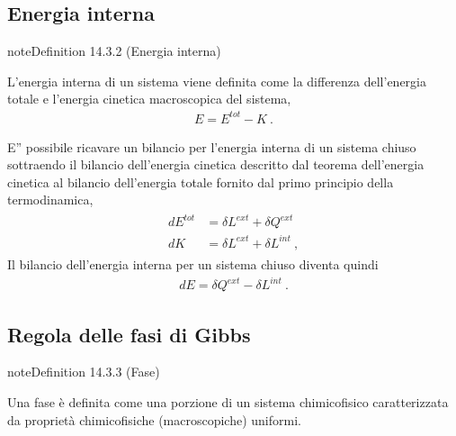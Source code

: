 \documentclass[letterpaper,10pt,italian]{jupyterBook}
\begin{document}
\subsection{Energia interna}
\label{\detokenize{ch/thermodynamics/principles-gibbs-phase-rule:energia-interna}}\label{\detokenize{ch/thermodynamics/principles-gibbs-phase-rule:physics-hs-thermodynamics-foundation-principles-gibbs-phase-rule-internal-energy}}\label{ch/thermodynamics/principles-gibbs-phase-rule:definition-2}
\begin{sphinxadmonition}{note}{Definition 14.3.2 (Energia interna)}



\sphinxAtStartPar
L’energia interna di un sistema viene definita come la differenza dell’energia totale e l’energia cinetica macroscopica del sistema,
\begin{equation*}
\begin{split}E = E^{tot} - K \ .\end{split}
\end{equation*}\end{sphinxadmonition}

\sphinxAtStartPar
E” possibile ricavare un bilancio per l’energia interna di un sistema chiuso sottraendo il bilancio dell’energia cinetica descritto dal teorema dell’energia cinetica al bilancio dell’energia totale fornito dal primo principio della termodinamica,
\begin{equation*}
\begin{split}\begin{aligned}
  d E^{tot} & = \delta L^{ext} + \delta Q^{ext} \\
  d K       & = \delta L^{ext} + \delta L^{int} \ ,
\end{aligned}\end{split}
\end{equation*}
\sphinxAtStartPar
Il bilancio dell’energia interna per un sistema chiuso diventa quindi
\begin{equation*}
\begin{split}d E = \delta Q^{ext} - \delta L^{int} \ .\end{split}
\end{equation*}

\subsection{Regola delle fasi di Gibbs}
\label{\detokenize{ch/thermodynamics/principles-gibbs-phase-rule:regola-delle-fasi-di-gibbs}}\label{\detokenize{ch/thermodynamics/principles-gibbs-phase-rule:physics-hs-thermodynamics-foundation-principles-gibbs-phase-rule-gibbs-phase-rule}}\label{ch/thermodynamics/principles-gibbs-phase-rule:definition-3}
\begin{sphinxadmonition}{note}{Definition 14.3.3 (Fase)}



\sphinxAtStartPar
Una fase è definita come una porzione di un sistema chimico\sphinxhyphen{}fisico caratterizzata da proprietà chimico\sphinxhyphen{}fisiche (macroscopiche) uniformi.
\end{sphinxadmonition}
\end{document}
